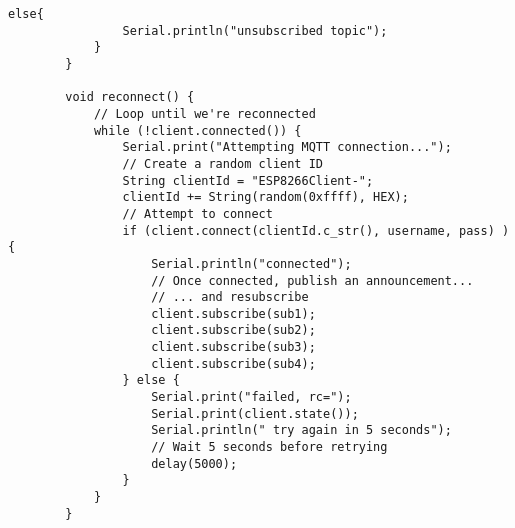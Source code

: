 \begin{flushleft}
\begin{lstlisting}[style=CStyle]
			else{
				Serial.println("unsubscribed topic");
			}
		}
		
		void reconnect() {
			// Loop until we're reconnected
			while (!client.connected()) {
				Serial.print("Attempting MQTT connection...");
				// Create a random client ID
				String clientId = "ESP8266Client-";
				clientId += String(random(0xffff), HEX);
				// Attempt to connect
				if (client.connect(clientId.c_str(), username, pass) ) {
					Serial.println("connected");
					// Once connected, publish an announcement...
					// ... and resubscribe
					client.subscribe(sub1);
					client.subscribe(sub2);
					client.subscribe(sub3);
					client.subscribe(sub4);
				} else {
					Serial.print("failed, rc=");
					Serial.print(client.state());
					Serial.println(" try again in 5 seconds");
					// Wait 5 seconds before retrying
					delay(5000);
				}
			}
		}
		
		
	\end{lstlisting}
\end{flushleft}

\newpage